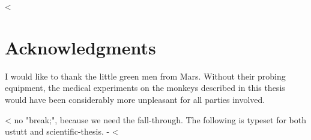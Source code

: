 {{\begin{abstract}
\begin{abstract}
\begin{abstract}
\emph{As a single sentence, what’s the key impact of your research?
  Here we’re not looking for the outcome of an experiment.
}
We’re looking for a summary of the implications.
What’s it all mean?
Why should other people care?
What can they do with your research.
(Essay folks: all the same questions apply: what conclusions did you draw, and why would anyone care about them?)

<%
\lipsum[1]

<%
<%
<%
\end{abstract}

<%
\end{abstract}

\maketitle
<%
\end{abstract}

%
\IEEEpeerreviewmaketitle
<%
\pagestyle{scrheadings}
\clearpage

\chapter*{Acknowledgments}
I would like to thank the little green men from Mars.
Without their probing equipment, the medical experiments on the monkeys described in this thesis would have been considerably more unpleasant for all parties involved.
\clearpage

<%
no "break;", because we need the fall-through.
The following is typeset for both ustutt and scientific-thesis.
-%
<%


%
%
\tableofcontents

}}
